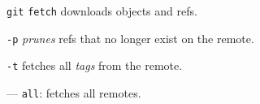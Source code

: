 %

\begin{compactenum}
\item [\texttt{git}] \texttt{fetch} downloads objects and refs.
\item [\texttt{-p}] \emph{prunes} refs that no longer exist on the remote.
\item [\texttt{-t}] fetches all \emph{tags} from the remote.
\item [---] \texttt{all}: fetches all remotes.
\end{compactenum}

%
